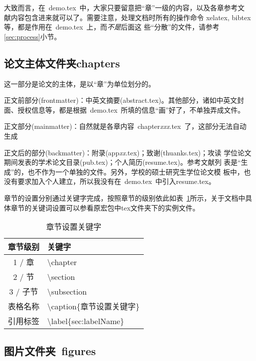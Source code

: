 大致而言，在~demo.tex~中，大家只要留意把``章''一级的内容，以及各章参考文
献内容包含进来就可以了。需要注意，处理文档时所有的操作命令
{}\cndash{}xelatex, bibtex等，都是作用在~demo.tex~上，而\emph{不是}后面这
些``分散''的文件，请参考\ref{sec:process}小节。

\subsection{论文主体文件夹chapters}
\label{sec:thesisbody}

这一部分是论文的主体，是以``章''为单位划分的。

正文前部分(frontmatter)：中英文摘要(abstract.tex)。其他部分，诸如中英文封
面、授权信息等，都是根据~demo.tex~所填的信息``画''好了，不单独弄成文件。

正文部分(mainmatter)：自然就是各章内容~chapter\emph{xxx}.tex~了，这部分无法自动生成

正文后的部分(backmatter)：附录(app\emph{xx}.tex)；致谢(thuanks.tex)；攻读
学位论文期间发表的学术论文目录(pub.tex)；个人简历(resume.tex)。参考文献列
表是``生成''的，也不作为一个单独的文件。另外，学校的硕士研究生学位论文模
板中，也没有要求加入个人建立，所以我没有在~demo.tex~中引入resume.tex。

章节的设置分别通过关键字完成，按照章节的级别依此如表~\ref{tab:setSection}所示，关于文档中具体章节的关键词设置可以参看原宏包中tex文件夹下的实例文件。


\begin{table}[htb]
 \centering
  \caption{章节设置关键字}     %
  \label{tab:setSection}    %
  \begin{tabular}{cl}
    \hline
    章节级别        & 关键字     \\
    \hline
    1 / 章        & \textbackslash chapter \\
    2 / 节        & \textbackslash section \\
    3 / 子节      & \textbackslash  subsection \\
    表格名称       & \textbackslash caption\{章节设置关键字\} \\
    引用标签       & \textbackslash label\{sec:labelName\} \\
    \hline
  \end{tabular}
\end{table}



\subsection{图片文件夹~figures}
\label{sec:figuresdir}

